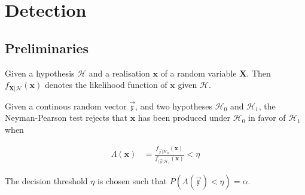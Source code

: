 \documentclass[a4paper, openany, oneside]{memoir}
\begin{document}
\chapter{Detection}

\section{Preliminaries}




\begin{blockDefinition}
Given a hypothesis $\mathcal{H}$ and a realisation $\mathbf{x}$ of a random variable $\mathbf{X}$. Then $f_{\mathbf{X} | \mathcal{H}}(\mathbf{x})$ denotes the likelihood function of $\mathbf{x}$ given $\mathcal{H}$.
\end{blockDefinition}

\begin{blockDefinition}
Given a continous random vector $\vec{\mathfrak{x}}$, and two hypotheses $\mathcal{H}_0$ and $\mathcal{H}_1$, the Neyman-Pearson test rejects that $\mathbf{x}$ has been produced under $\mathcal{H}_0$ in favor of $\mathcal{H}_1$ when

\begin{align*}
    \Lambda (\mathbf{x}) &= \frac{f_{\vec{\mathfrak{x}} | \mathcal{H}_0} (\mathbf{x})}{f_{(\vec{\mathfrak{x}} | \mathcal{H}_1}(\mathbf{x})} < \eta 
\end{align*}

The decision threshold $\eta$ is chosen such that $P(\Lambda(\vec{\mathfrak{x}}) < \eta) = \alpha$.
\end{blockDefinition}
\end{document}
